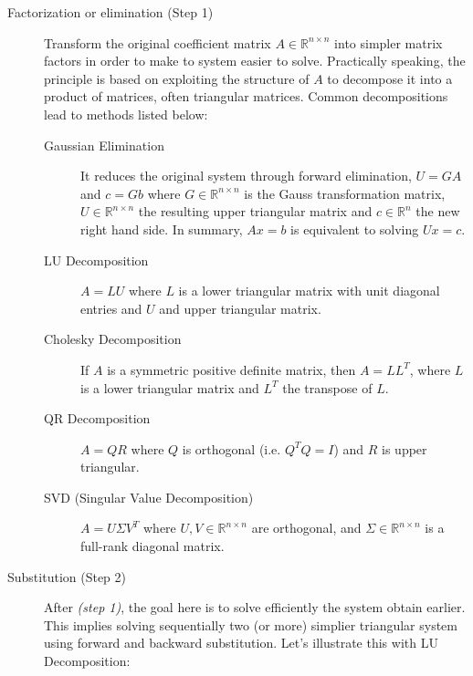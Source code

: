\begin{description}
\item[Factorization or elimination (Step 1)] Transform the original coefficient matrix $A \in \mathbb{R}^{n \times n}$ into simpler matrix factors in order to make to system easier to solve. Practically speaking, the principle is based on exploiting the structure of $A$ to decompose it into a product of matrices, often triangular matrices. Common decompositions lead to methods listed below:
\begin{description}
\item[Gaussian Elimination] It reduces the original system through forward elimination, $U = GA$ and $c = Gb$ where $G \in \mathbb{R}^{n \times n}$ is the Gauss transformation matrix, $U \in \mathbb{R}^{n \times n}$ the resulting upper triangular matrix and $c \in \mathbb{R}^{n}$ the new right hand side. In summary,  $Ax = b$ is equivalent to solving $Ux = c$. 
\item[LU Decomposition] $A = LU$ where $L$ is a lower triangular matrix with unit diagonal entries and $U$ and upper triangular matrix.
\item[Cholesky Decomposition] If $A$ is a symmetric positive definite matrix, then $A = LL^{T}$, where $L$ is a lower triangular matrix and $L^{T}$ the transpose of $L$. 
\item[QR Decomposition] $A = QR$ where $Q$ is orthogonal (i.e. $Q^{T}Q = I$) and $R$ is upper triangular.
\item[SVD (Singular Value Decomposition)] $A = U \Sigma V^{T}$ where $U,V \in \mathbb{R}^{n \times n}$ are orthogonal, and $\Sigma \in \mathbb{R}^{n \times n}$ is a full-rank diagonal matrix.
\end{description}

\item[Substitution (Step 2)] After \textit{(step 1)}, the goal here is to solve efficiently the system obtain earlier. This implies solving sequentially two (or more) simplier triangular system using forward and backward substitution. Let's illustrate this with LU Decomposition:

\end{description}




